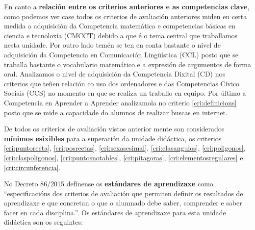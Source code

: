 En canto a \textbf{relación entre os criterios anteriores e as competencias clave}, como podemos ver case todos os criterios de avaliación anteriores miden en certa medida a adquisición da Competencia matemática e competencias básicas en ciencia e tecnoloxía (CMCCT) debido a que é o tema central que traballamos nesta unidade. Por outro lado temén se ten en conta bastante o nivel de adquisición da Competencia en Comunicación Lingüística (CCL) posto que se traballa bastante o vocabulario matemático e a expresión de argumentos de forma oral. Analizamos o nivel de adquisición da Competencia Dixital (CD) nos criterios que teñen relación co uso dos ordenadores e das Competencias Cívico Sociais (CCS) no momento en que se realiza un traballo en equipo. Por último a Competencia en Aprender a Aprender analizamola no criterio \ref{cri:definicions} posto que se mide a capacidade do alumnos de realizar buscas en internet.

De todos os criterios de avaliación vistos anterior mente son considerados \textbf{mínimos esixibles} para a superación da unidade didáctica, os criterios \ref{cri:puntorecta}, \ref{cri:posrectas}, \ref{cri:sexasesimal}, \ref{cri:clasangulos}, \ref{cri:poligonos}, \ref{cri:claspoligonos}, \ref{cri:puntosnotables}, \ref{cri:pitagoras}, \ref{cri:elementosregulares} e \ref{cri:circunferencia}.

No Decreto 86/2015 defínense os \textbf{estándares de aprendizaxe} como ``especificacións dos criterios de avaliación que permiten definir os resultados de aprendizaxe e que concretan o que o alumnado debe saber, comprender e saber facer en cada disciplina.''. Os estándares de aprendizaxe para esta unidade didáctica son os seguintes:

